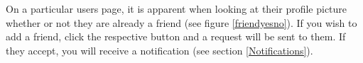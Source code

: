 \documentclass[10pt]{article}
\begin{document}
\begin{flushleft}

On a particular users page, it is apparent when looking at their profile picture whether or not they are already a friend (see figure \ref{friendyesno}).  If you wish to add a friend, click the respective button and a request will be sent to them.  If they accept, you will receive a notification (see section \ref{Notifications}).

\end{flushleft}

\begin{figure}[H]
    \centering
    \qquad

\end{figure}
\end{document}
